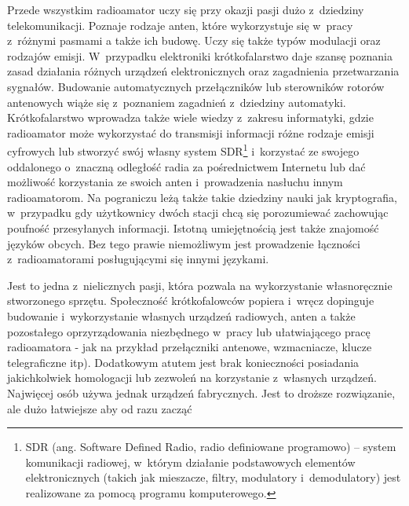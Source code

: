 \documentclass[eng,oneside]{mgr}
\begin{document}
			Przede wszystkim radioamator uczy się przy okazji pasji dużo z~dziedziny telekomunikacji. Poznaje rodzaje anten, które wykorzystuje się w~pracy z~różnymi pasmami a także ich budowę. Uczy się także typów modulacji oraz rodzajów emisji. W~przypadku elektroniki krótkofalarstwo daje szansę poznania zasad działania różnych urządzeń elektronicznych oraz zagadnienia przetwarzania sygnałów. Budowanie automatycznych przełączników lub sterowników rotorów antenowych wiąże się z~poznaniem zagadnień z~dziedziny automatyki. Krótkofalarstwo wprowadza także wiele wiedzy z~zakresu informatyki, gdzie radioamator może wykorzystać do transmisji informacji różne rodzaje emisji cyfrowych lub stworzyć swój własny system SDR\footnote{SDR (ang. Software Defined Radio, radio definiowane programowo) – system komunikacji radiowej, w~którym działanie podstawowych elementów elektronicznych (takich jak mieszacze, filtry, modulatory i~demodulatory) jest realizowane za pomocą programu komputerowego.} i~korzystać ze swojego oddalonego o~znaczną odległość radia za pośrednictwem Internetu lub dać możliwość korzystania ze swoich anten i~prowadzenia nasłuchu innym radioamatorom. Na pograniczu leżą także takie dziedziny nauki jak kryptografia, w~przypadku gdy użytkownicy dwóch stacji chcą się porozumiewać zachowując poufność przesyłanych informacji. Istotną umiejętnością jest także znajomość języków obcych. Bez tego prawie niemożliwym jest prowadzenie łączności z~radioamatorami posługującymi się innymi językami.

			Jest to jedna z~nielicznych pasji, która pozwala na wykorzystanie własnoręcznie stworzonego sprzętu. Społeczność krótkofalowców popiera i~wręcz dopinguje budowanie i~wykorzystanie własnych urządzeń radiowych, anten a także pozostałego oprzyrządowania niezbędnego w~pracy lub ułatwiającego pracę radioamatora - jak na przykład przełączniki antenowe, wzmacniacze, klucze telegraficzne itp). Dodatkowym atutem jest brak konieczności posiadania jakichkolwiek homologacji lub zezwoleń na korzystanie z~własnych urządzeń. Najwięcej osób używa jednak urządzeń fabrycznych. Jest to droższe rozwiązanie, ale dużo łatwiejsze aby od razu zacząć 
\end{document}

